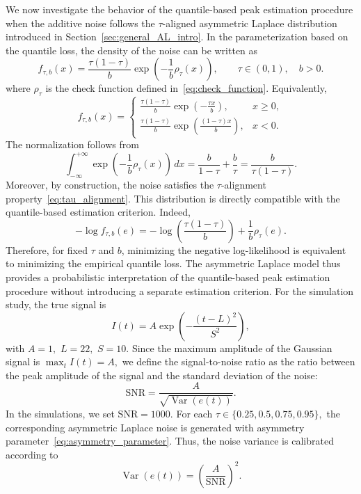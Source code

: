 \documentclass[12pt,a4paper]{article}
\begin{document}
We now investigate the behavior of the quantile-based peak estimation procedure when the additive noise follows the $\tau$-aligned asymmetric Laplace distribution introduced in Section~\ref{sec:general_AL_intro}. In the parameterization based on the quantile loss, the density of the noise can be written as
\begin{equation}
	f_{\tau,b}(x)
	=
	\frac{\tau(1-\tau)}{b}
	\exp\left(
	-\frac{1}{b}\rho_\tau(x)
	\right),
	\qquad
	\tau\in(0,1),\quad b>0.
	\label{eq:AL_density}
\end{equation}
where $\rho_\tau$ is the check function defined in~\eqref{eq:check_function}.
Equivalently,
\[
f_{\tau,b}(x)
=
\begin{cases}
	\displaystyle
	\frac{\tau(1-\tau)}{b}
	\exp\left(-\frac{\tau x}{b}\right), & x\geq 0, \\[8pt]
	\displaystyle
	\frac{\tau(1-\tau)}{b}
	\exp\left(\frac{(1-\tau)x}{b}\right), & x<0.
\end{cases}
\]
The normalization follows from
\[
\int_{-\infty}^{+\infty}
\exp\left(-\frac{1}{b}\rho_\tau(x)\right)\,dx
=
\frac{b}{1-\tau}+\frac{b}{\tau}
=
\frac{b}{\tau(1-\tau)}.
\]
Moreover, by construction,
the noise satisfies the $\tau$-alignment property~\eqref{eq:tau_alignment}.
This distribution is directly compatible with the quantile-based estimation criterion. Indeed,
\[
-\log f_{\tau,b}(e)
=
-\log\left(\frac{\tau(1-\tau)}{b}\right)
+
\frac{1}{b}\rho_\tau(e).
\]
Therefore, for fixed $\tau$ and $b$, minimizing the negative log-likelihood is equivalent to minimizing the empirical quantile loss. The asymmetric Laplace model thus provides a probabilistic interpretation of the quantile-based peak estimation procedure without introducing a separate estimation criterion.
For the simulation study, the true signal is
\[
I(t)
=
A\exp\left(-\frac{(t-L)^2}{S^2}\right),
\]
with
$A=1,$
$L=22,$
$S=10.$
Since the maximum amplitude of the Gaussian signal is
\(
\max_t I(t)=A,
\)
we define the signal-to-noise ratio as the ratio between the peak
amplitude of the signal and the standard deviation of the noise:
\begin{equation}
	\mathrm{SNR}
	=
	\frac{A}{\sqrt{\operatorname{Var}(e(t))}}.
	\label{eq:SNR_definition}
\end{equation}
In the simulations, we set
\(
\mathrm{SNR}=1000.
\)
For each
\(
\tau\in\{0.25,0.5,0.75,0.95\},
\)
the corresponding asymmetric Laplace noise is generated with asymmetry
parameter~\eqref{eq:asymmetry_parameter}. Thus, the noise variance is
calibrated according to
\begin{equation}
	\operatorname{Var}(e(t))
	=
	\left(\frac{A}{\mathrm{SNR}}\right)^2.
	\label{eq:SNR_condition}
\end{equation}
\end{document}
